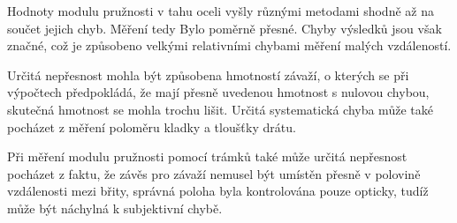 \documentclass[protokol.tex]{subfiles}
\begin{document}
Hodnoty modulu pružnosti v tahu oceli vyšly různými metodami shodně až na součet jejich chyb. Měření tedy Bylo poměrně přesné. Chyby výsledků jsou však značné, což je způsobeno velkými relativními chybami měření malých vzdáleností.

Určitá nepřesnost mohla být způsobena hmotností závaží, o kterých se při výpočtech předpokládá, že mají přesně uvedenou hmotnost s nulovou chybou, skutečná hmotnost se mohla trochu lišit. Určitá systematická chyba může také pocházet z měření poloměru kladky a tloušťky drátu. 

Při měření modulu pružnosti pomocí trámků také může určitá nepřesnost pocházet z faktu, že závěs pro závaží nemusel být umístěn přesně v polovině vzdálenosti mezi břity, správná poloha byla kontrolována pouze opticky, tudíž může být náchylná k subjektivní chybě.
\end{document}

